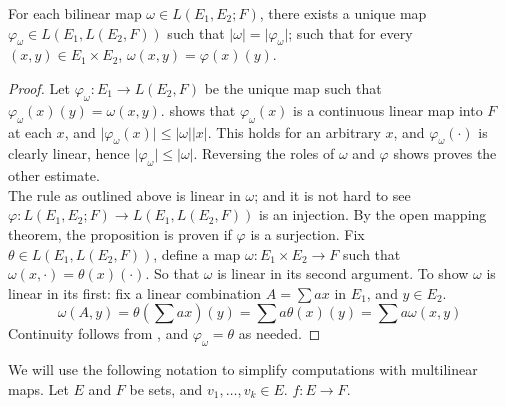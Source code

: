 \documentclass[../main-manifolds.tex]{subfiles}
\begin{document}
\begin{wts}[$L(E_1,E_2;F)$ is isomorphic to $L(E_1, L(E_2,F))$]\label{prop:bilinear-map-isomorphism-currying}
    For each bilinear map $\omega\in L(E_1,E_2;F)$, there exists a unique map $\varphi_\omega\in L(E_1, L(E_2,F))$ such that $\vert \omega\vert = \vert\varphi_\omega\vert$; such that for every $(x,y)\in E_1\times E_2$, $\omega(x,y) = \varphi(x)(y)$.
\end{wts}
\begin{proof}
    Let $\varphi_\omega: E_1\to L(E_2,F)$ be the unique map such that $\varphi_\omega(x)(y) = \omega(x,y)$.  shows that $\varphi_\omega(x)$ is a continuous linear map into $F$ at each $x$, and $\vert\varphi_\omega(x)\vert\leq\vert\omega\vert\vert x\vert$. This holds for an arbitrary $x$, and $\varphi_{\omega}(\cdot)$ is clearly linear, hence $\vert\varphi_\omega\vert\leq\vert\omega\vert$. Reversing the roles of $\omega$ and $\varphi$ shows proves the other estimate.\\

    The rule as outlined above is linear in $\omega$; and it is not hard to see $\varphi: L(E_1,E_2; F)\to L(E_1, L(E_2, F))$ is an injection. By the open mapping theorem, the proposition is proven if $\varphi$ is a surjection. Fix $\theta\in L(E_1, L(E_2,F))$, define a map $\omega: E_1\times E_2\to F$ such that $\omega(x,\cdot) = \theta(x)(\cdot)$. So that $\omega$ is linear in its second argument. To show $\omega$ is linear in its first: fix a linear combination $A = \sum ax$ in $E_1$, and $y\in E_2$. 
    \[
    \omega(A,y) =\theta(\sum ax)(y) = \sum a\theta(x)(y) = \sum a\omega(x,y)
    \]
    Continuity follows from , and $\varphi_\omega = \theta$ as needed.
\end{proof}
We will use the following notation to simplify computations with multilinear maps. Let $E$ and $F$ be sets, and $v_1,\ldots, v_k\in E$. $f: E\to F$.
\end{document}
